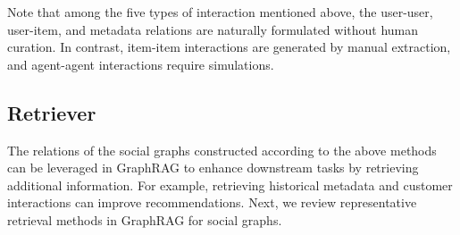 Note that among the five types of interaction mentioned above, the user-user, user-item, and metadata relations are naturally formulated without human curation. In contrast, item-item interactions are generated by manual extraction, and agent-agent interactions require simulations.



\subsection{Retriever}
The relations of the social graphs constructed according to the above methods can be leveraged in GraphRAG to enhance downstream tasks by retrieving additional information. For example, retrieving historical metadata and customer interactions can improve recommendations. Next, we review representative retrieval methods in GraphRAG for social graphs.

